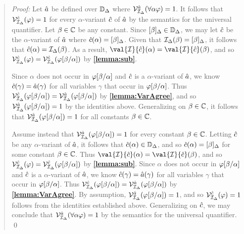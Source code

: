 \begin{quote} 
  \textit{Proof:}
  Let $\hat{a}$ be defined over $\mathbb{D}_{\Delta}$ where $\mathcal{V}_{\mathcal{I}_{\Delta}}^{\hat{a}}(\forall \alpha\varphi)=1$.
  It follows that $\mathcal{V}_{\mathcal{I}_{\Delta}}^{\hat{c}}(\varphi)=1$ for every $\alpha$-variant $\hat{c}$ of $\hat{a}$ by the semantics for the universal quantifier.
  Let $\beta\in\mathbb{C}$ be any constant. 
  Since $[\beta]_{\Delta}\in\mathbb{D}_{\Delta}$, we may let $\hat{c}$ be the $\alpha$-variant of $\hat{a}$ where $\hat{c}(\alpha)=[\beta]_{\Delta}$.
  Given that $\mathcal{I}_{\Delta}(\beta)=[\beta]_{\Delta}$, it follows that $\hat{c}(\alpha)=\mathcal{I}_{\Delta}(\beta)$.
  As a result, $\val{\I}{\va{c}}(\alpha)=\val{\I}{\va{c}}(\beta)$, and so $\mathcal{V}_{\mathcal{I}_{\Delta}}^{\hat{c}}(\varphi)=\mathcal{V}_{\mathcal{I}_{\Delta}}^{\hat{c}}(\varphi[\beta/\alpha])$ by \textbf{\ref{lemma:sub}}.

  Since $\alpha$ does not occur in $\varphi[\beta/\alpha]$ and $\hat{c}$ is a $\alpha$-variant of $\hat{a}$, we know $\hat{c}(\gamma) = \hat{a}(\gamma)$ for all variables $\gamma$ that occur in $\varphi[\beta/\alpha]$.
  Thus $\mathcal{V}_{\mathcal{I}_{\Delta}}^{\hat{c}}(\varphi[\beta/\alpha])=\mathcal{V}_{\mathcal{I}_{\Delta}}^{\hat{a}}(\varphi[\beta/\alpha])$ by \textbf{\ref{lemma:VarAgree}}, and so $\mathcal{V}_{\mathcal{I}_{\Delta}}^{\hat{a}}(\varphi[\beta/\alpha]) = 1$ by the identities above.
  Generalizing on $\beta\in\mathbb{C}$, it follows that $\mathcal{V}_{\mathcal{I}_{\Delta}}^{\hat{a}}(\varphi[\beta/\alpha])=1$ for all constants $\beta\in\mathbb{C}$.

  Assume instead that $\mathcal{V}_{\mathcal{I}_{\Delta}}^{\hat{a}}(\varphi[\beta/\alpha])=1$ for every constant $\beta\in\mathbb{C}$.
  Letting $\hat{c}$ be any $\alpha$-variant of $\hat{a}$, it follows that $\hat{c}(\alpha)\in\mathbb{D}_{\Delta}$, and so $\hat{c}(\alpha)=[\beta]_{\Delta}$ for some constant $\beta\in\mathbb{C}$.
  Thus $\val{\I}{\va{c}}(\alpha)=\val{\I}{\va{c}}(\beta)$, and so $\mathcal{V}_{\mathcal{I}_{\Delta}}^{\hat{c}}(\varphi)=\mathcal{V}_{\mathcal{I}_{\Delta}}^{\hat{c}}(\varphi[\beta/\alpha])$ by \textbf{\ref{lemma:sub}}.
  Since $\alpha$ does not occur in $\varphi[\beta/\alpha]$ and $\hat{c}$ is a $\alpha$-variant of $\hat{a}$, we know $\hat{c}(\gamma) = \hat{a}(\gamma)$ for all variables $\gamma$ that occur in $\varphi[\beta/\alpha]$.
  Thus $\mathcal{V}_{\mathcal{I}_{\Delta}}^{\hat{c}}(\varphi[\beta/\alpha])=\mathcal{V}_{\mathcal{I}_{\Delta}}^{\hat{a}}(\varphi[\beta/\alpha])$ by \textbf{\ref{lemma:VarAgree}}.
  By assumption, $\mathcal{V}_{\mathcal{I}_{\Delta}}^{\hat{a}}(\varphi[\beta/\alpha]) = 1$, and so $\mathcal{V}_{\mathcal{I}_{\Delta}}^{\hat{c}}(\varphi) = 1$ follows from the identities established above.
  Generalizing on $\hat{c}$, we may conclude that $\mathcal{V}_{\mathcal{I}_{\Delta}}^{\hat{a}}(\forall \alpha\varphi)=1$ by the semantics for the universal quantifier. 
  \qed
\end{quote}




